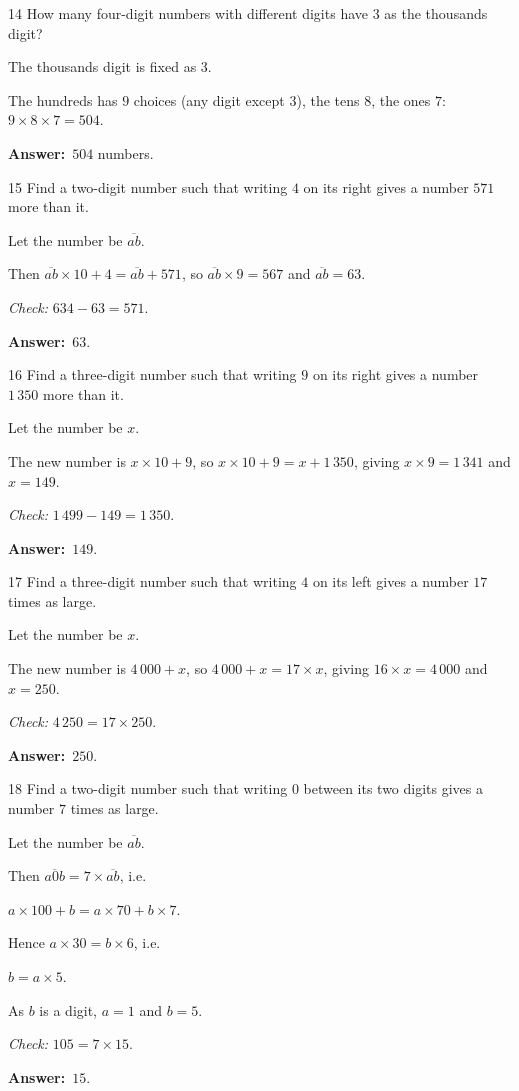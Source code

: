 \documentclass[11pt]{article}
\newif\ifsol \solfalse
\providecommand{\AnsWord}{Đáp số}
\newcommand{\dapso}[1]{\par\textbf{\AnsWord:}\ #1}
\newcommand{\probsol}[1]{%
  \begin{lrbox}{\solmeasure}\begin{minipage}{\dimexpr\linewidth-24pt\relax}#1\end{minipage}\end{lrbox}%
  \ifsol
    \begin{solbox}#1\end{solbox}%
  \else
    \setlength{\solht}{\dimexpr\ht\solmeasure+\dp\solmeasure+0.85cm\relax}%
    \ifdim\solht<1.35cm\setlength{\solht}{1.35cm}\fi
    \begin{tcolorbox}[colback=white,colframe=Line,boxrule=0.8pt,arc=5pt,
      left=8pt,right=8pt,top=4pt,bottom=4pt,height=\solht]{\footnotesize\color{Slate}\itshape\WorkWord}\end{tcolorbox}%
  \fi}
\newcommand{\nd}[1]{\overline{#1}}
\newcommand{\gap}{\vspace{0.3cm}}
\def\WorkWord{Your work:}
\def\AnsWord{Answer}
\begin{document}
\gap
\begin{probbox}{14}{\relax}
How many four-digit numbers with different digits have $3$ as the thousands digit?
\end{probbox}
\probsol{
The thousands digit is fixed as $3$.\par The hundreds has $9$ choices (any digit except $3$), the tens $8$, the ones $7$: $9\times8\times7=504$.
\dapso{$504$ numbers.}}
\gap
\begin{probbox}{15}{\relax}
Find a two-digit number such that writing $4$ on its right gives a number $571$ more than it.
\end{probbox}
\probsol{
Let the number be $\nd{ab}$.\par Then $\nd{ab}\times10+4=\nd{ab}+571$, so $\nd{ab}\times9=567$ and $\nd{ab}=63$.\par
\emph{Check:} $634-63=571$.
\dapso{$63$.}}
\gap
\begin{probbox}{16}{\relax}
Find a three-digit number such that writing $9$ on its right gives a number $1\,350$ more than it.
\end{probbox}
\probsol{
Let the number be $x$.\par The new number is $x\times10+9$, so $x\times10+9=x+1\,350$, giving $x\times9=1\,341$ and $x=149$.\par
\emph{Check:} $1\,499-149=1\,350$.
\dapso{$149$.}}
\gap
\begin{probbox}{17}{\relax}
Find a three-digit number such that writing $4$ on its left gives a number $17$ times as large.
\end{probbox}
\probsol{
Let the number be $x$.\par The new number is $4\,000+x$, so $4\,000+x=17\times x$, giving $16\times x=4\,000$ and $x=250$.\par
\emph{Check:} $4\,250=17\times250$.
\dapso{$250$.}}
\gap
\begin{probbox}{18}{\relax}
Find a two-digit number such that writing $0$ between its two digits gives a number $7$ times as large.
\end{probbox}
\probsol{
Let the number be $\nd{ab}$.\par Then $\nd{a0b}=7\times\nd{ab}$, i.e.\par $a\times100+b=a\times70+b\times7$.\par
Hence $a\times30=b\times6$, i.e.\par $b=a\times5$.\par As $b$ is a digit, $a=1$ and $b=5$.\par
\emph{Check:} $105=7\times15$.
\dapso{$15$.}}
\end{document}

